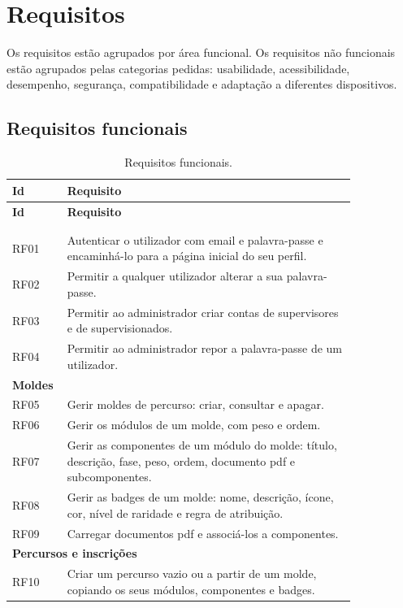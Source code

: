 \section{Requisitos}

Os requisitos estão agrupados por área funcional. Os requisitos não funcionais estão agrupados pelas categorias pedidas: usabilidade, acessibilidade, desempenho, segurança, compatibilidade e adaptação a diferentes dispositivos.

\subsection{Requisitos funcionais}

\begingroup\small
\begin{longtable}{lp{0.84\linewidth}}
\toprule
\textbf{Id} & \textbf{Requisito} \\
\midrule
\endfirsthead
\toprule
\textbf{Id} & \textbf{Requisito} \\
\midrule
\endhead
\bottomrule
\endfoot
\bottomrule
\caption{Requisitos funcionais.}\label{tab:rf}\\
\endlastfoot
\multicolumn{2}{l}{\textbf{Autenticação e contas}} \\
RF01 & Autenticar o utilizador com email e palavra-passe e encaminhá-lo para a página inicial do seu perfil. \\
RF02 & Permitir a qualquer utilizador alterar a sua palavra-passe. \\
RF03 & Permitir ao administrador criar contas de supervisores e de supervisionados. \\
RF04 & Permitir ao administrador repor a palavra-passe de um utilizador. \\
\midrule
\multicolumn{2}{l}{\textbf{Moldes}} \\
RF05 & Gerir moldes de percurso: criar, consultar e apagar. \\
RF06 & Gerir os módulos de um molde, com peso e ordem. \\
RF07 & Gerir as componentes de um módulo do molde: título, descrição, fase, peso, ordem, documento \gls{pdf} e subcomponentes. \\
RF08 & Gerir as badges de um molde: nome, descrição, ícone, cor, nível de raridade e regra de atribuição. \\
RF09 & Carregar documentos \gls{pdf} e associá-los a componentes. \\
\midrule
\multicolumn{2}{l}{\textbf{Percursos e inscrições}} \\
RF10 & Criar um percurso vazio ou a partir de um molde, copiando os seus módulos, componentes e badges. \\

\end{longtable}
